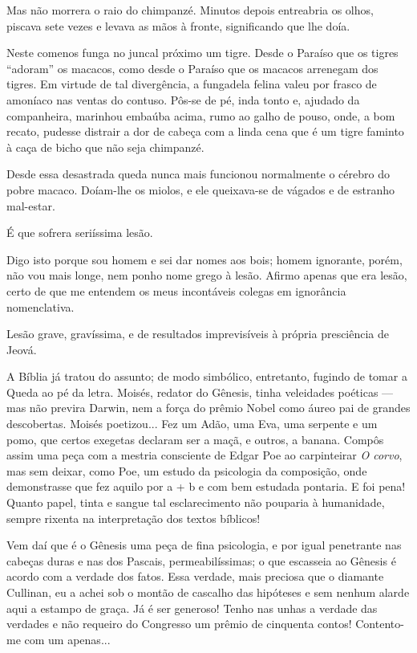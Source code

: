 Mas não morrera o raio do chimpanzé. Minutos depois entreabria os olhos,
piscava sete vezes e levava as mãos à fronte, significando que lhe doía.

Neste comenos funga no juncal próximo um tigre. Desde o Paraíso que os
tigres ``adoram'' os macacos, como desde o Paraíso que os macacos
arrenegam dos tigres. Em virtude de tal divergência, a fungadela felina
valeu por frasco de amoníaco nas ventas do contuso. Pôs-se de pé, inda
tonto e, ajudado da companheira, marinhou embaúba acima, rumo ao galho
de pouso, onde, a bom recato, pudesse distrair a dor de cabeça com a
linda cena que é um tigre faminto à caça de bicho que não seja
chimpanzé.

Desde essa desastrada queda nunca mais funcionou normalmente o cérebro
do pobre macaco. Doíam-lhe os miolos, e ele queixava-se de vágados e de
estranho mal-estar.

É que sofrera seriíssima lesão.

Digo isto porque sou homem e sei dar nomes aos bois; homem ignorante,
porém, não vou mais longe, nem ponho nome grego à lesão. Afirmo apenas
que era lesão, certo de que me entendem os meus incontáveis colegas em
ignorância nomenclativa.

Lesão grave, gravíssima, e de resultados imprevisíveis à própria
presciência de Jeová.

A Bíblia já tratou do assunto; de modo simbólico, entretanto, fugindo de
tomar a Queda ao pé da letra. Moisés, redator do Gênesis, tinha
veleidades poéticas --- mas não previra Darwin, nem a força do prêmio
Nobel como áureo pai de grandes descobertas. Moisés poetizou... Fez um
Adão, uma Eva, uma serpente e um pomo, que certos exegetas declaram ser
a maçã, e outros, a banana. Compôs assim uma peça com a mestria
consciente de Edgar Poe ao carpinteirar \emph{O corvo}, mas sem deixar,
como Poe, um estudo da psicologia da composição, onde demonstrasse que
fez aquilo por a + b e com bem estudada pontaria. E foi pena! Quanto
papel, tinta e sangue tal esclarecimento não pouparia à humanidade,
sempre rixenta na interpretação dos textos bíblicos!

Vem daí que é o Gênesis uma peça de fina psicologia, e por igual
penetrante nas cabeças duras e nas dos Pascais, permeabilíssimas; o que
escasseia ao Gênesis é acordo com a verdade dos fatos. Essa verdade,
mais preciosa que o diamante Cullinan, eu a achei sob o montão de
cascalho das hipóteses e sem nenhum alarde aqui a estampo de graça. Já é
ser generoso! Tenho nas unhas a verdade das verdades e não requeiro do
Congresso um prêmio de cinquenta contos! Contento-me com um apenas...

